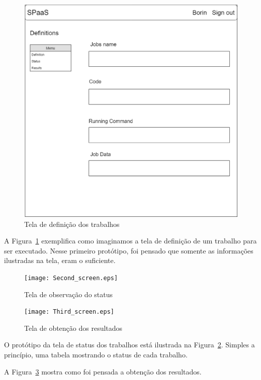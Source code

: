 \documentclass[11pt,twoside]{article}
\begin{document}
\begin{figure}[!h]
  \centering
  \includegraphics[scale=0.2]{First_screen.eps}
  \caption{Tela de definição dos trabalhos}
  \label{fig:definitionScreen}
\end{figure}

A Figura~\ref{fig:definitionScreen} exemplifica como imaginamos a tela de definição de um trabalho para ser executado. Nesse primeiro protótipo, foi pensado que somente 
as informações ilustradas na tela, eram o suficiente.

\begin{figure}[!h]
  \centering
  \texttt{[image: Second\_screen.eps]}
  \caption{Tela de observação do status}
  \label{fig:statusScreen}
\end{figure}

\begin{figure}[!h]
  \centering
  \texttt{[image: Third\_screen.eps]}
  \caption{Tela de obtenção dos resultados}
  \label{fig:resultsScreen}
\end{figure}

O protótipo da tela de status dos trabalhos está ilustrada na Figura~\ref{fig:statusScreen}. Simples a princípio, uma tabela mostrando o status de cada trabalho. 

A Figura~\ref{fig:resultsScreen} mostra como foi pensada a obtenção dos resultados.
\end{document}
